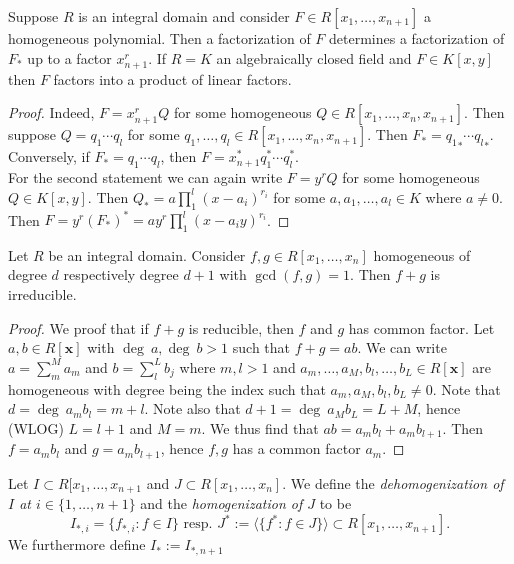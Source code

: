 \begin{corollary}\label{LinearFactoringOfForms}
    Suppose $R$ is an integral domain and consider $F\in R[x_1,\dots,x_{n+1}]$ a homogeneous polynomial. Then a factorization of $F$ determines a factorization of $F_\ast$ up to a factor $x_{n+1}^r$. If $R=K$ an algebraically closed field and $F\in K[x,y]$ then $F$ factors into a product of linear factors.  
\end{corollary}
\begin{proof}
    Indeed, $F=x_{n+1}^rQ$ for some homogeneous $Q\in R[x_1,\dots,x_n,x_{n+1}]$. Then suppose $Q=q_1\cdots q_l$ for some $q_1,\dots,q_l\in R[x_1,\dots,x_n,x_{n+1}]$. Then $F_\ast = {q_1}_\ast \cdots {q_l}_\ast$. Conversely, if $F_\ast=q_1\cdots q_l$, then $F=x_{n+1}^\ast q_1^\ast\cdots q_l^\ast$.\\
    For the second statement we can again write $F=y^rQ$ for some homogeneous $Q\in K[x,y]$. Then $Q_\ast = a\prod_1^l(x-a_i)^{r_i}$ for some $a,a_1,\dots,a_l\in K$ where $a\neq0$. Then $F=y^r(F_\ast)^\ast = ay^r\prod_1^l (x-a_iy)^{r_i}$.
\end{proof}
\begin{proposition}\label{SumsOfCoprimeHomogeneousPolynomialOfConsecutiveDegree}
    Let $R$ be an integral domain. Consider $f,g\in R[x_1,\dots,x_n]$ homogeneous of degree $d$ respectively degree $d+1$ with $\gcd(f,g)=1$. Then $f+g$ is irreducible.
\end{proposition}
\begin{proof}
    We proof that if $f+g$ is reducible, then $f$ and $g$ has common factor. Let $a,b\in R[\mathbf{x}]$ with $\deg \ a, \deg \ b>1$ such that $f+g=ab$. We can write $a = \sum_m^M a_m$ and $b=\sum_l^L b_j$ where $m,l>1$ and $a_m,\dots,a_M,b_l,\dots,b_L\in R[\mathbf{x}]$ are homogeneous with degree being the index such that $a_m,a_M,b_l,b_L\neq 0$. Note that $d= \deg\ a_mb_l = m+l$. Note also that $d+1=\deg\ a_Mb_L = L+M$, hence (WLOG) $L=l+1$ and $M=m$. We thus find that $ab=a_mb_l+a_mb_{l+1}$. Then $f=a_mb_l$ and $g=a_mb_{l+1}$, hence $f,g$ has a common factor $a_m$. 
\end{proof}
\begin{definition}\label{(De)HomogenizationOfIdeals}
    Let $I\subset R[x_1,\dots,x_{n+1}$ and $J\subset R[x_1,\dots,x_n]$. We define the \textit{dehomogenization of $I$ at $i\in\{1,\dots,n+1\}$} and the \textit{homogenization of $J$} to be 
    $$I_{\ast,i} = \{ f_{\ast,i} : f\in I\} \text{ resp. } J^\ast := \langle\{f^\ast : f \in J\}\rangle \subset R[x_1,\dots,x_{n+1}].$$
    We furthermore define $I_\ast := I_{\ast, n+1}$
\end{definition}

